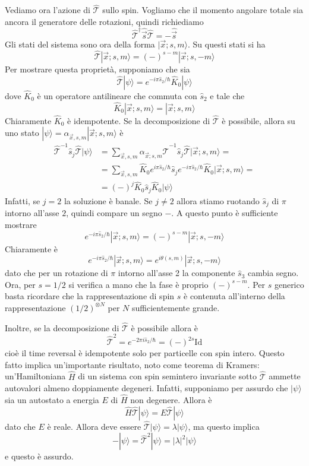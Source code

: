 \documentclass[a4paper, 11pt]{article}
\newcommand{\op}[1]{\hat{#1}}
\newcommand{\id}{\mathrm{Id}}
\renewcommand{\op}[1]{\hat{#1}}
\newcommand{\ham}{\hat{H}}
\renewcommand{\ket}[1]{| #1\rangle}
\newcommand{\T}{\op{\mathcal{T}}}
\begin{document}
Vediamo ora l'azione di $\T$ sullo spin. Vogliamo che il momento angolare totale sia ancora il generatore delle rotazioni, quindi richiediamo
\[\T^\dagger\op{\vec{s}}\T=-\op{\vec{s}}\]
Gli stati del sistema sono ora della forma $\ket{\vec{x};s,m}$. Su questi stati si ha
\[\T\ket{\vec{x};s,m}=(-)^{s-m}\ket{\vec{x};s,-m}\]
Per mostrare questa proprietà, supponiamo che sia
\[\T\ket{\psi}=e^{-i\pi \op{s}_2/\hbar}\op K_0\ket{\psi}\]
dove $\op{K}_0$ è un operatore antilineare che commuta con $\op s_2$ e tale che
\[\op{K}_0\ket{\vec{x};s,m}=\ket{\vec{x};s,m}\]
Chiaramente $\op{K}_0$ è idempotente. Se la decomposizione di $\T$ è possibile, allora su uno stato $\ket{\psi}=\alpha_{\vec{x},s,m}\ket{\vec{x};s,m}$ è
\begin{align*}
	\T^{-1}\op s_j\T\ket{\psi}&=\sum_{\vec{x},s,m}\alpha_{\vec{x};s,m}\T^{-1}\op s_j\T\ket{\vec{x};s,m}=\\&=\sum_{\vec{x},s,m}\op K_0e^{i\pi\op s_2/\hbar}\op s_je^{-i\pi\op s_2/\hbar}\op K_0\ket{\vec{x};s,m}=\\&=(-)^j\op K_0\op s_j\op K_0\ket{\psi}
\end{align*}
Infatti, se $j=2$ la soluzione è banale. Se $j\neq2$ allora stiamo ruotando $\op s_j$ di $\pi$ intorno all'asse $2$, quindi compare un segno $-$. A questo punto è sufficiente mostrare 
\[e^{-i\pi \op s_2/\hbar}\ket{\vec{x};s,m}=(-)^{s-m}\ket{\vec{x};s,-m}\]
Chiaramente è
\[e^{-i\pi\op s_2/\hbar}\ket{\vec{x};s,m}=e^{i\theta(s,m)}\ket{\vec{x};s,-m}\]
dato che per un rotazione di $\pi$ intorno all'asse 2 la componente $\op s_3$ cambia segno. Ora, per $s=1/2$ si verifica a mano che la fase è proprio $(-)^{s-m}$. Per $s$ generico basta ricordare che la rappresentazione di spin $s$ è contenuta all'interno della rappresentazione $(1/2)^{\otimes N}$ per $N$ sufficientemente grande.

Inoltre, se la decomposizione di $\T$ è possibile allora è
\[\T^2=e^{-2\pi i\op s_2/\hbar}=(-)^{2s}\id\]
cioè il time reversal è idempotente solo per particelle con spin intero. Questo fatto implica un'importante risultato, noto come teorema di Kramers: un'Hamiltoniana $\ham$ di un sistema con spin semintero invariante sotto $\T$ ammette autovalori almeno doppiamente degeneri. Infatti, supponiamo per assurdo che $\ket{\psi}$ sia un autostato a energia $E$ di $\ham$ non degenere. Allora è
\[\ham\T\ket{\psi}=E\T\ket{\psi}\]
dato che $E$ è reale. Allora deve essere $\T\ket{\psi}=\lambda\ket{\psi}$, ma questo implica
\[-\ket{\psi}=\T^2\ket{\psi}=|\lambda|^2\ket{\psi}\]
e questo è assurdo.%
\end{document}
